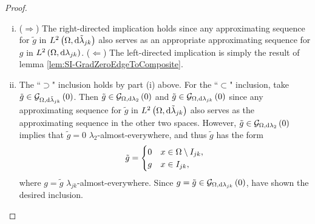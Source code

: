 \begin{proof}
	\begin{enumerate}[(i)]
		\item ($\Rightarrow$) The right-directed implication holds since any approximating sequence for $\tilde{g}$ in $L^{2}\left( \Omega,\mathrm{d}\tilde{\lambda}_{jk} \right)$ also serves as an appropriate approximating sequence for $g$ in $L^{2}\left( \Omega,\mathrm{d}\lambda_{jk} \right)$. \newline
		($\Leftarrow$) The left-directed implication is simply the result of lemma \ref{lem:SI-GradZeroEdgeToComposite}.
		\item The ``$\supset$" inclusion holds by part (i) above.
		For the ``$\subset$" inclusion, take $\tilde{g}\in\mathcal{G}_{ \Omega, \mathrm{d}\tilde{\lambda}_{jk}}\left( 0 \right)$.
		Then $\tilde{g}\in\mathcal{G}_{ \Omega, \mathrm{d}\lambda_2}\left( 0 \right)$ and $\tilde{g}\in\mathcal{G}_{ \Omega, \mathrm{d}\lambda_{jk}}\left( 0 \right)$ since any approximating sequence for $\tilde{g}$ in $L^{2}\left( \Omega,\mathrm{d}\tilde{\lambda}_{jk} \right)$ also serves as the approximating sequence in the other two spaces.
		However, $\tilde{g}\in\mathcal{G}_{ \Omega, \mathrm{d}\lambda_2}\left( 0 \right)$ implies that $\tilde{g}=0$ $\lambda_2$-almost-everywhere,	and thus $\tilde{g}$ has the form
		\begin{align*}
			\tilde{g} = \begin{cases} 0 & x\in\Omega\setminus I_{jk}, \\ g & x\in I_{jk}, \end{cases}
		\end{align*}
		where $g = \tilde{g}$ $\lambda_{jk}$-almost-everywhere.
		Since $g = \tilde{g}\in\mathcal{G}_{ \Omega, \mathrm{d}\lambda_{jk}}\left( 0 \right)$, have shown the desired inclusion.
	\end{enumerate}
\end{proof}

